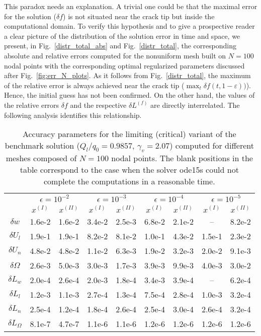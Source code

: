 This paradox needs an explanation. A trivial one could be that the maximal error for the solution ($\delta f$) is not situated near the crack tip but inside the computational domain.
To verify this hypothesis and to give a prospective reader a clear picture of the distribution of the solution error in time and space, we present, in  Fig.~\ref{distr_total_abs} and Fig.~\ref{distr_total},
the corresponding absolute and relative errors computed for the nonuniform mesh built on $N=100$ nodal points with the corresponding optimal regularized parameters
discussed after Fig.~\ref{fig:err_N_plots}. As it follows from Fig.~\ref{distr_total}, the maximum of the relative error is always achieved near the crack tip
($\max_{t}\delta f(t,1-\varepsilon))$). Hence, the initial guess has not been confirmed.
On the other hand, the values of the relative errors $\delta f$ and the respective $\delta L^{(f)}$
are directly interrelated. The following analysis identifies this relationship.


\begin{table*}
\centering
\begin{tabular}{c|c|c|c|c|c|c|c|c|}
\cline{2-9}
& \multicolumn{2}{c|}{$\epsilon=10^{-2}$} & \multicolumn{2}{c|}{$\epsilon=10^{-3}$}& \multicolumn{2}{c|}{$\epsilon=10^{-4}$} & \multicolumn{2}{c|}{$\epsilon=10^{-5}$}
\\ \cline{2-9}
& $x^{(I)}$ & $x^{(II)}$& $x^{(I)}$ & $x^{(II)}$& $x^{(I)}$ & $x^{(II)}$& $x^{(I)}$ & $x^{(II)}$
\\ \cline{1-9}
\multicolumn{1}{|c|}{$\delta w$}&1.6e-2&1.6e-2&3.4e-2&2.5e-3&6.8e-2&2.1e-2&--&8.2e-2
 \\ \cline{1-9}
\multicolumn{1}{|c|}{$\delta U_l$}&1.9e-1&1.9e-1&8.2e-2&8.1e-2&1.0e-1&4.3e-2&1.5e-1&2.3e-2
 \\ \cline{1-9}
\multicolumn{1}{|c|}{$\delta U_n$}&4.8e-2&4.8e-2&1.1e-2&6.3e-3&1.9e-2&3.2e-3&2.0e-2&9.1e-3
 \\ \cline{1-9}
\multicolumn{1}{|c|}{$\delta \Omega$}&2.6e-3&5.0e-3&3.0e-3&1.7e-3&3.9e-3&9.9e-3&4.0e-3&3.0e-2
 \\ \cline{1-9}
\multicolumn{1}{|c|}{$\delta L_w$}&2.0e-4&2.6e-4&2.0e-3&1.8e-4&3.4e-3&3.9e-4&--&6.2e-4
 \\ \cline{1-9}
\multicolumn{1}{|c|}{$\delta L_l$}&1.2e-3&1.1e-3&2.7e-4&1.3e-4&7.5e-4&2.8e-4&1.0e-3&3.2e-4
 \\ \cline{1-9}
\multicolumn{1}{|c|}{$\delta L_n$}&2.5e-4&1.2e-4&1.8e-4&2.6e-4&2.5e-4&3.0e-4&2.6e-4&3.2e-4
 \\ \cline{1-9}
\multicolumn{1}{|c|}{$\delta L_\Omega$}&8.1e-7&4.7e-7&1.1e-6&1.1e-6&1.2e-6&1.2e-6&1.2e-6&1.2e-6
 \\ \cline{1-9}
\end{tabular}
\caption{Accuracy parameters for the limiting (critical) variant of the benchmark solution ($Q_l/q_0=0.9857$, $\gamma_v=2.07$)
computed for different meshes composed of $N=100$ nodal points. The blank positions in the table correspond to the case when the solver ode15s could not complete the computations in a reasonable time.}
\label{table_very_bad_benchmark}
\end{table*}




